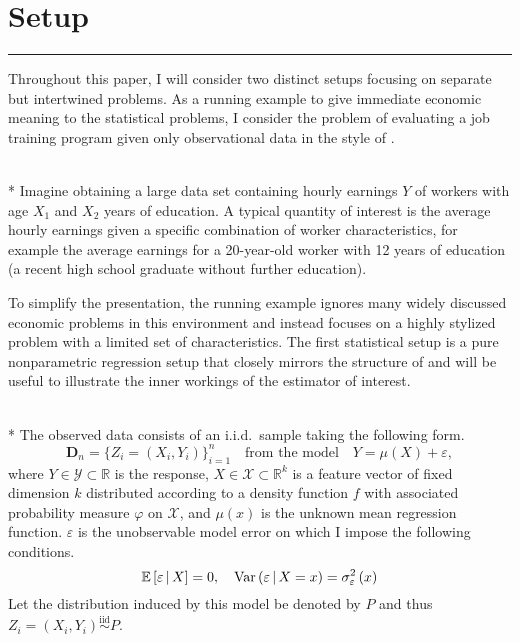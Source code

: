 \section{Setup}\label{sec:setup}
\hrule
Throughout this paper, I will consider two distinct setups focusing on separate but intertwined problems.
As a running example to give immediate economic meaning to the statistical problems, I consider the problem of evaluating a job training program given only observational data in the style of \citet{lalonde_evaluating_1986}.
\begin{boxE}
	\begin{exmp}\label{exmp:run_exmp}\mbox{}\\*
        Imagine obtaining a large data set containing hourly earnings $Y$ of workers with age $X_1$ and $X_2$ years of education.
        A typical quantity of interest is the average hourly earnings given a specific combination of worker characteristics, for example the average earnings for a 20-year-old worker with 12 years of education (a recent high school graduate without further education).
	\end{exmp}
\end{boxE}
To simplify the presentation, the running example ignores many widely discussed economic problems in this environment and instead focuses on a highly stylized problem with a limited set of characteristics.
The first statistical setup is a pure nonparametric regression setup that closely mirrors the structure of \citet{demirkaya_optimal_2024} and will be useful to illustrate the inner workings of the estimator of interest.
\begin{boxD}
	\begin{asm}\label{asm:npr_dgp}\mbox{}\\*
		The observed data consists of an i.i.d.\ sample taking the following form.
		\begin{equation}\label{DGP1}
			\mathbf{D}_n = \{Z_{i} = (X_{i}, Y_{i})\}_{i = 1}^{n}
			\quad \text{from the model} \quad
			Y = \mu(X) + \varepsilon,
		\end{equation}
		where $Y \in \mathcal{Y} \subset \mathbb{R}$ is the response, $X \in \mathcal{X} \subset \mathbb{R}^k$ is a feature vector of fixed dimension $k$ distributed according to a density function $f$ with associated probability measure $\varphi$ on $\mathcal{X}$, and $\mu(x)$ is the unknown mean regression function.
		$\varepsilon$ is the unobservable model error on which I impose the following conditions.
		\begin{equation}
			\mathbb{E}\left[\varepsilon \, \middle| \, X\right] = 0, \quad
			\text{Var}\left(\varepsilon \, \middle| \, X = x\right) = \sigma_{\varepsilon}^2\left(x\right)
		\end{equation}
		Let the distribution induced by this model be denoted by $P$ and thus $Z_{i} = \left(X_{i}, Y_{i}\right) \overset{\text{iid}}{\sim} P$.
	\end{asm}
\end{boxD}
